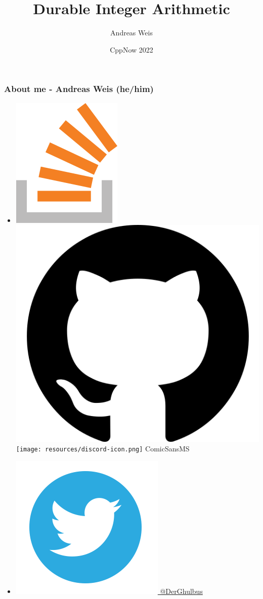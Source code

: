 \documentclass[aspectratio=169]{beamer}
\title{Durable Integer Arithmetic}
\author{Andreas Weis}
\institute{Woven Planet}
\date{CppNow 2022}
\begin{document}
\frame{\titlepage}


\begin{frame}[fragile]
  \frametitle{About me - Andreas Weis (he/him)}

  \begin{itemize}
    \setlength\itemsep{1.5em}

    \item \href{https://stackoverflow.com/users/577603/comicsansms}{\includegraphics[height=.05\textheight]{resources/so-icon.png}} \href{https://github.com/ComicSansMS}{\includegraphics[height=.05\textheight]{resources/github-icon.png}} \texttt{[image: resources/discord-icon.png]} ComicSansMS

    \item \href{https://twitter.com/DerGhulbus/}{\includegraphics[height=.05\textheight]{resources/twitter-icon.png} @DerGhulbus}


\end{itemize}
\end{frame}
\end{document}
